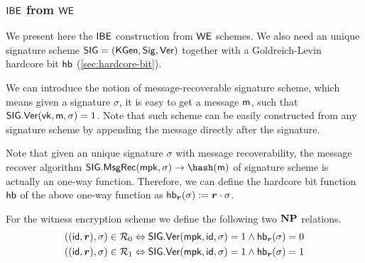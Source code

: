 \subsubsection{$\mathsf{IBE}$ from $\mathsf{WE}$}

We present here the $\mathsf{IBE}$ construction from $\mathsf{WE}$ schemes. We also need an unique signature scheme $\mathsf{SIG} = (\mathsf{KGen}, \mathsf{Sig}, {\mathsf{Ver}})$ together with a Goldreich-Levin~\cite{STOC:GolLev89} hardcore bit $\mathsf{hb}$ (\cref{sec:hardcore-bit}).

We can introduce the notion of message-recoverable signature scheme, which means given a signature $\sigma$, it is easy to get a message $\mathsf{m}$, such that $\mathsf{SIG}.{\mathsf{Ver}}({\mathsf{vk}}, \mathsf{m}, \sigma) =1$. Note that such scheme can be easily constructed from any signature scheme by appending the message directly after the signature. 

Note that given an unique signature $\sigma$ with message recoverability, the message recover algorithm $\SIG.\MsgRec(\mpk, \sigma) \to \hash(\msg)$ of signature scheme is actually an one-way function. Therefore, we can define the hardcore bit function $\mathsf{hb}$ of the above one-way function as $\hb_{\vec{r}}(\sigma)\gets \vec{r} \cdot \sigma$.

For the witness encryption scheme we define the following two ${\mathbf{NP}}$ relations.
\begin{align*}
    ((\id, \vec{r}), \sigma) \in \Rel_0 & \Leftrightarrow \SIG.\Ver(\mpk, \id,  \sigma) = 1 \land \hb_{\vec{r}}(\sigma) = 0 \\
    ((\id, \vec{r}), \sigma) \in \Rel_1 & \Leftrightarrow \SIG.\Ver(\mpk, \id,  \sigma) = 1 \land \hb_{\vec{r}}(\sigma) = 1
\end{align*}

